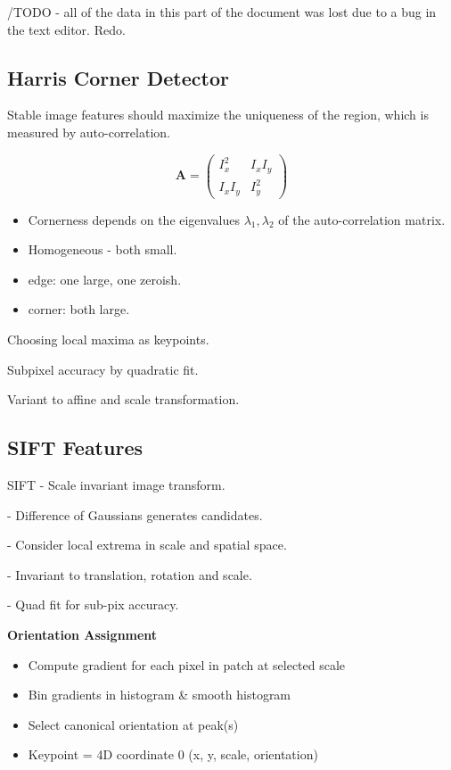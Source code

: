 /TODO - all of the data in this part of the document was lost due to a bug in the text editor. Redo.

\subsection{Harris Corner Detector}

Stable image features should maximize the uniqueness of the region, which is measured by auto-correlation.

$$ \mathbf{A} = \left(  \begin{matrix} I_x^2 &  I_xI_y \\
I_xI_y & I_y^2
\end{matrix} \right) $$

\begin{itemize}
\item Cornerness depends on the eigenvalues $\lambda_1,\lambda_2$ of the auto-correlation matrix.
\item Homogeneous - both small.
\item edge: one large, one zeroish.
\item corner: both large.
\end{itemize}

Choosing local maxima as keypoints. 

Subpixel accuracy by quadratic fit.

Variant to affine and scale transformation.

\subsection{SIFT Features}

SIFT - Scale invariant image transform.

- Difference of Gaussians generates candidates. 

- Consider local extrema in scale and spatial space.

- Invariant to translation, rotation and scale.

- Quad fit for sub-pix accuracy.

\textbf{Orientation Assignment}
\begin{itemize}
\item  Compute gradient for each pixel in patch at selected scale
\item  Bin gradients in histogram \& smooth histogram
\item  Select canonical orientation at peak(s)
\item  Keypoint = 4D coordinate 0 (x, y, scale, orientation)
\end{itemize}

